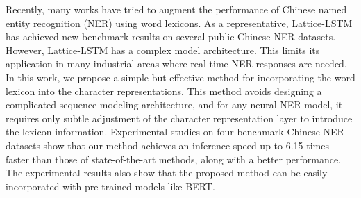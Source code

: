 Recently, many works have tried to augment the performance of Chinese named entity recognition (NER) using word lexicons. As a representative, Lattice-LSTM has achieved new benchmark results on several public Chinese NER datasets. However, Lattice-LSTM has a complex model architecture. This limits its application in many industrial areas where real-time NER responses are needed. In this work, we propose a simple but effective method for incorporating the word lexicon into the character representations. This method avoids designing a complicated sequence modeling architecture, and for any neural NER model, it requires only subtle adjustment of the character representation layer to introduce the lexicon information. Experimental studies on four benchmark Chinese NER datasets show that our method achieves an inference speed up to 6.15 times faster than those of state-of-the-art methods, along with a better performance. The experimental results also show that the proposed method can be easily incorporated with pre-trained models like BERT.
